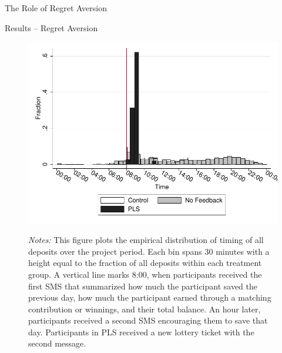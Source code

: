 \documentclass[aspectratio=169]{beamer}
\begin{document}
\begin{frame}{The Role of Regret Aversion}

	

\end{frame}

\begin{frame}{Results -- Regret Aversion}

		\begin{figure}[ht]
		\centering
		\caption{Timing of deposits}
		\includegraphics[height=0.8\textheight]{../../figures/hist-deposits.pdf}
		\label{fig:hist-deposits}
		\caption*{\footnotesize \emph{Notes:} This figure plots the empirical distribution of timing of all deposits over the project period. Each bin spans 30 minutes with a height equal to the fraction of all deposits within each treatment group. A vertical line marks 8:00, when participants received the first SMS that summarized how much the participant saved the previous day, how much the participant earned through a matching contribution or winnings, and their total balance. An hour later, participants received a second SMS encouraging them to save that day. Participants in PLS received a new lottery ticket with the second message.}
		\end{figure}


\end{frame}
\end{document}
